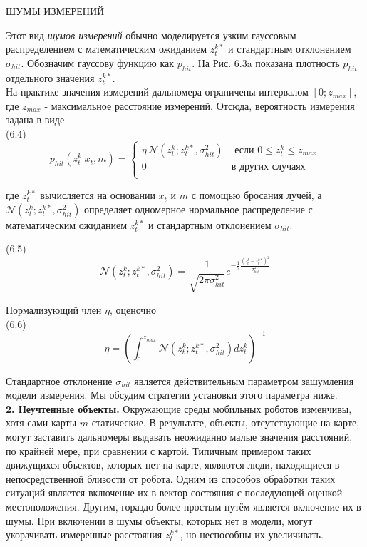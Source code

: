 \documentclass[10pt,a4paper]{article}
\begin{document}
ШУМЫ ИЗМЕРЕНИЙ 

Этот вид \textit{шумов измерений} обычно моделируется узким гауссовым распределением с математическим ожиданием $z^{k*}_t$ и стандартным отклонением $\sigma_{hit}$. Обозначим гауссову функцию как $p_{hit}$. На Рис. 6.3a показана плотность $p_{hit}$  отдельного значения $z_t^{k*}$.\\

На практике значения измерений дальномера ограничены интервалом $[0; z_{max}]$, где $z_{max}$ - максимальное расстояние измерений. Отсюда, вероятность измерения задана в виде\\

(6.4) 
\begin{equation*}
p_{hit}(z_t^k|x_t,m)=\left\{
\begin{array}{ll}
\eta\, \mathcal N(z_t^k;z_t^{k*},\sigma_{hit}^2) & \mbox{ если }0\leq z_t^k\leq z_{max}\\
0 & \mbox{в других случаях}\\
\end{array}
\right.
\end{equation*}

где $z_t^{k*}$ вычисляется на основании $x_t$ и $m$ с помощью бросания лучей, а $\mathcal N(z_t^k;z_t^{k*},\sigma_{hit}^2)$
определяет одномерное нормальное распределение с математическим ожиданием $z_t^{k*}$ и стандартным отклонением $\sigma_{hit}$:

(6.5)
$$\mathcal N(z_t^k;z_t^{k*},\sigma_{hit}^2)=\frac{1}{\sqrt{2\pi\sigma_{hit}^2}}e^{-\frac{1}{2}\frac{(z_t^k - z_t^{k*})^2}{\sigma_{hit}^2}}$$

Нормализующий член $\eta$, оценочно\\

(6.6)
$$\eta=\left( \int_0^{z_{max}}\mathcal N(z_t^k;z_t^{k*},\sigma_{hit}^2)dz_t^k\right) ^{-1}$$

Стандартное отклонение $\sigma_{hit}$ является действительным параметром зашумления модели измерения. Мы обсудим стратегии установки этого параметра ниже. \\

\textbf{2. Неучтенные объекты.} Окружающие среды мобильных роботов изменчивы, хотя сами карты $m$ статические. В результате, объекты, отсутствующие на карте, могут заставить дальномеры выдавать неожиданно малые значения расстояний, по крайней мере, при сравнении с картой. Типичным примером таких движущихся объектов, которых нет на карте, являются люди, находящиеся в непосредственной близости от робота. Одним из способов обработки таких ситуаций является включение их в вектор состояния с последующей оценкой местоположения. Другим, гораздо более простым путём является включение их в шумы. 
При включении в шумы объекты, которых нет в модели, могут укорачивать измеренные расстояния $z_t^{k*}$, но неспособны их увеличивать.
\end{document}
